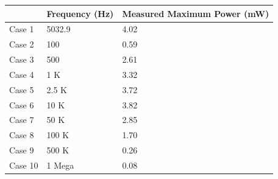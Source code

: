 \documentclass[12pt]{article}
\begin{document}
\begin{tabular}{|l|l|l|}
    \hline
    & Frequency (Hz) & Measured Maximum Power (mW) \\ \hline 
    Case 1 & 5032.9 & 4.02 \\ \hline
    Case 2 & 100 & 0.59 \\ \hline
    Case 3 & 500 & 2.61 \\ \hline
    Case 4 & 1 K & 3.32 \\ \hline
    Case 5 & 2.5 K & 3.72 \\ \hline
    Case 6 & 10 K & 3.82 \\ \hline
    Case 7 & 50 K & 2.85 \\ \hline
    Case 8 & 100 K & 1.70 \\ \hline
    Case 9 & 500 K & 0.26 \\ \hline
    Case 10 & 1 Mega & 0.08 \\ \hline
\end{tabular}
\end{document}
